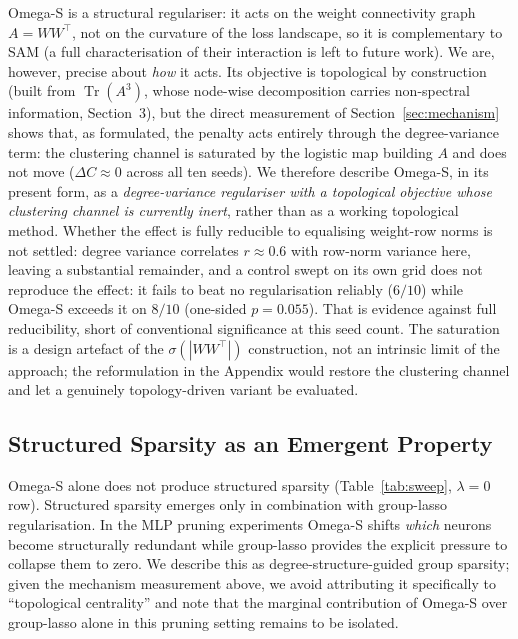 \documentclass[11pt,a4paper]{article}
\begin{document}
Omega-S is a structural regulariser: it acts on the weight connectivity
graph $A=WW^\top$, not on the curvature of the loss landscape, so it is
complementary to SAM (a full characterisation of their interaction is left
to future work). We are, however, precise about \emph{how} it acts. Its
objective is topological by construction (built from $\operatorname{Tr}(A^3)$,
whose node-wise decomposition carries non-spectral information, Section~3),
but the direct measurement of Section~\ref{sec:mechanism} shows that, as
formulated, the penalty acts entirely through the degree-variance term: the
clustering channel is saturated by the logistic map building $A$ and does
not move ($\Delta C\approx0$ across all ten seeds). We therefore describe
Omega-S, in its present form, as a \emph{degree-variance regulariser with a
topological objective whose clustering channel is currently inert}, rather
than as a working topological method. Whether the effect is fully reducible
to equalising weight-row norms is not settled: degree variance correlates
$r\approx0.6$ with row-norm variance here, leaving a substantial remainder,
and a control swept on its own grid does not reproduce the effect: it fails to
beat no regularisation reliably ($6/10$) while Omega-S exceeds it on $8/10$
(one-sided $p=0.055$). That is evidence against full reducibility, short of
conventional significance at this seed count. The saturation is a design artefact of the
$\sigma(|WW^\top|)$ construction, not an intrinsic limit of the approach; the
reformulation in the Appendix would restore the clustering channel and let a
genuinely topology-driven variant be evaluated.

\subsection{Structured Sparsity as an Emergent Property}

Omega-S alone does not produce structured sparsity (Table~\ref{tab:sweep},
$\lambda{=}0$ row). Structured sparsity emerges only in combination with
group-lasso regularisation. In the MLP pruning experiments Omega-S shifts
\emph{which} neurons become structurally redundant while group-lasso
provides the explicit pressure to collapse them to zero. We describe this as
degree-structure-guided group sparsity; given the mechanism measurement
above, we avoid attributing it specifically to ``topological centrality''
and note that the marginal contribution of Omega-S over group-lasso alone in
this pruning setting remains to be isolated.
\end{document}
